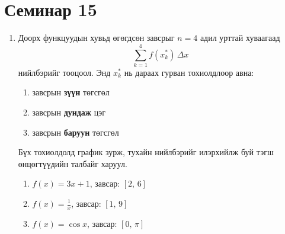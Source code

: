  \section{Семинар 15}
\begin{enumerate}
    \item Доорх функцуудын хувьд өгөгдсөн завсрыг 
$n=4$ адил урттай хуваагаад 
\[
\sum_{k=1}^4 f(x_k^*)\,\Delta x
\]
 нийлбэрийг тооцоол.
Энд $x_k^*$ нь дараах гурван тохиолдлоор авна:
\begin{enumerate}
\item[a)]  завсрын \textbf{зүүн} төгсгөл
\item[b)]  завсрын \textbf{дундаж} цэг
\item[c)]  завсрын \textbf{баруун} төгсгөл
\end{enumerate}
Бүх тохиолдолд график зурж, тухайн нийлбэрийг илэрхийлж буй тэгш өнцөгтүүдийн талбайг харуул.
\begin{enumerate}
\item $f(x)=3x+1$, \quad завсар: $[2,\,6]$

\item $f(x)=\frac{1}{x}$, \quad завсар: $[1,\,9]$

\item $f(x)=\cos x$, \quad завсар: $[0,\,\pi]$


\end{enumerate}
\end{enumerate}
